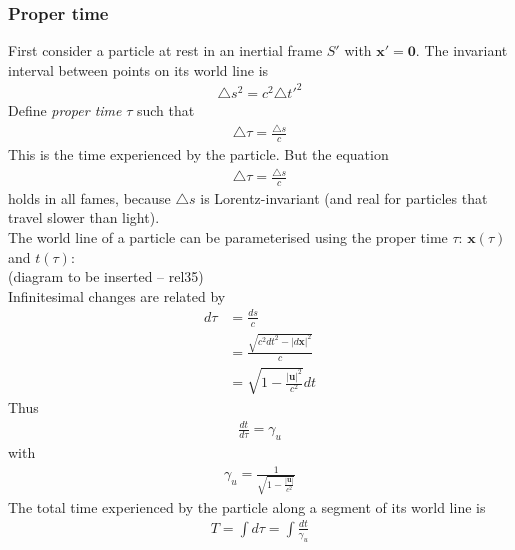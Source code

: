 \documentclass[a4paper]{article}
\begin{document}
\subsubsection{Proper time}
First consider a particle at rest in an inertial frame $S'$ with $\mathbf{x}' = \mathbf{0}$. The invariant interval between points on its world line is
\begin{equation*}
\begin{aligned}
\triangle s^2 = c^2 \triangle t'^2
\end{aligned}
\end{equation*}
Define \emph{proper time} $\tau$ such that
\begin{equation*}
\begin{aligned}
\triangle \tau = \frac{\triangle s}{c}
\end{aligned}
\end{equation*}
This is the time experienced by the particle. But the equation
\begin{equation*}
\begin{aligned}
\triangle \tau = \frac{\triangle s}{c}
\end{aligned}
\end{equation*}
holds in all fames, because $\triangle s$ is Lorentz-invariant (and real for particles that travel slower than light).\\
The world line of a particle can be parameterised using the proper time $\tau$: $\mathbf{x}\left(\tau\right)$ and $t\left(\tau\right)$:\\
(diagram to be inserted -- rel35)\\
Infinitesimal changes are related by
\begin{equation*}
\begin{aligned}
d\tau &= \frac{ds}{c}\\
&=\frac{\sqrt{c^2dt^2 - |d\mathbf{x}|^2}}{c}\\
&=\sqrt{1-\frac{|\mathbf{u}|^2}{c^2}} dt
\end{aligned}
\end{equation*}
Thus
\begin{equation*}
\begin{aligned}
\frac{dt}{d\tau} = \gamma_u
\end{aligned}
\end{equation*}
with
\begin{equation*}
\begin{aligned}
\gamma_u = \frac{1}{\sqrt{1-\frac{|\mathbf{u}|}{c^2}}}
\end{aligned}
\end{equation*}
The total time experienced by the particle along a segment of its world line is
\begin{equation*}
\begin{aligned}
T=\int d\tau = \int \frac{dt}{\gamma_u}
\end{aligned}
\end{equation*}
\end{document}
